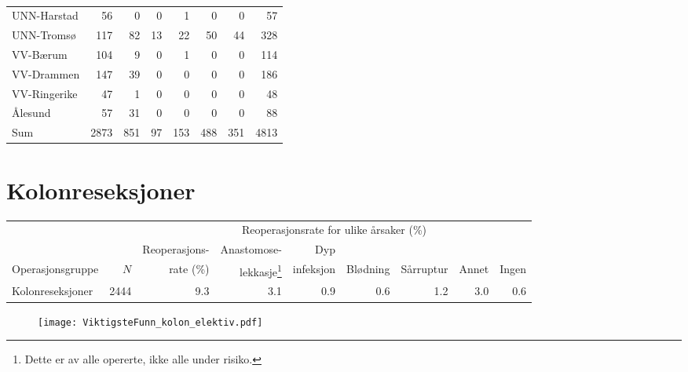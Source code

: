 \documentclass[norsk,a4paper]{article}\usepackage[]{graphicx}\usepackage[]{color}
\begin{document}
\begin{table}[ht]
\begin{tabular}{lrrrrrrr}
  UNN-Harstad & 56 & 0 & 0 & 1 & 0 & 0 & 57 \\ 
  UNN-Tromsø & 117 & 82 & 13 & 22 & 50 & 44 & 328 \\ 
  VV-Bærum  & 104 & 9 & 0 & 1 & 0 & 0 & 114 \\ 
  VV-Drammen & 147 & 39 & 0 & 0 & 0 & 0 & 186 \\ 
  VV-Ringerike & 47 & 1 & 0 & 0 & 0 & 0 & 48 \\ 
  Ålesund & 57 & 31 & 0 & 0 & 0 & 0 & 88 \\ 
   \midrule
Sum & 2873 & 851 & 97 & 153 & 488 & 351 & 4813 \\ 
   \hline
\end{tabular}
\caption{} 
\label{tab:RegistrenrendeAvd}
\end{table}


\clearpage


\section{Kolonreseksjoner}

\begin{table}[htb]
\begin{minipage}{\textwidth}
\centering
\begin{tabular}{lrrrrrrrr}
  \toprule
  & & & \multicolumn{4}{c}{Reoperasjonsrate for ulike årsaker (\%)} \\
 \cline{4-9} 
 & & Reoperasjons- & Anastomose- & Dyp &&&&  \\
 Operasjonsgruppe & $N$ & rate (\%) & lekkasje\footnote[2]{Dette er av alle opererte, ikke
alle under risiko.} & infeksjon & Blødning & Sårruptur & Annet & Ingen \\
 \midrule
Kolonreseksjoner & 2444 & 9.3 & 3.1 & 0.9 & 0.6 & 1.2 & 3.0 & 0.6 \\ 
   \bottomrule
\end{tabular}

\end{minipage}
\end{table}




\begin{figure}[ht]
\centering
\texttt{[image: ViktigsteFunn\_kolon\_elektiv.pdf]}
\caption{}
\end{figure}
\end{document}

